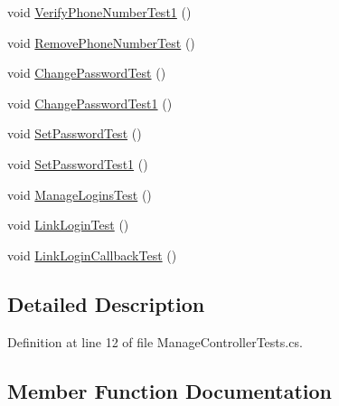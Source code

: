\begin{DoxyCompactItemize}
\item 
void \mbox{\hyperlink{class_brew_day2_1_1_controllers_1_1_tests_1_1_manage_controller_tests_a5c75a704b464473413d777a604c4e5f2}{Verify\+Phone\+Number\+Test1}} ()
\item 
void \mbox{\hyperlink{class_brew_day2_1_1_controllers_1_1_tests_1_1_manage_controller_tests_a871e48711dda070e563e559cc0261067}{Remove\+Phone\+Number\+Test}} ()
\item 
void \mbox{\hyperlink{class_brew_day2_1_1_controllers_1_1_tests_1_1_manage_controller_tests_af4ebad6cd88004066712e10698e682c3}{Change\+Password\+Test}} ()
\item 
void \mbox{\hyperlink{class_brew_day2_1_1_controllers_1_1_tests_1_1_manage_controller_tests_aa821b08002a649acce8a3915ff213450}{Change\+Password\+Test1}} ()
\item 
void \mbox{\hyperlink{class_brew_day2_1_1_controllers_1_1_tests_1_1_manage_controller_tests_a53cb70b1db0228d8ee4d9b4cd9ac5545}{Set\+Password\+Test}} ()
\item 
void \mbox{\hyperlink{class_brew_day2_1_1_controllers_1_1_tests_1_1_manage_controller_tests_ab0f016118fcf2b2baefac3bf615c0784}{Set\+Password\+Test1}} ()
\item 
void \mbox{\hyperlink{class_brew_day2_1_1_controllers_1_1_tests_1_1_manage_controller_tests_a0bc1e277fe59a196813658d93b06cde0}{Manage\+Logins\+Test}} ()
\item 
void \mbox{\hyperlink{class_brew_day2_1_1_controllers_1_1_tests_1_1_manage_controller_tests_ae88c5c07bcd5065bae4ed2dcb23e9651}{Link\+Login\+Test}} ()
\item 
void \mbox{\hyperlink{class_brew_day2_1_1_controllers_1_1_tests_1_1_manage_controller_tests_a3dca33d36df5299b2e82cb07729825ab}{Link\+Login\+Callback\+Test}} ()
\end{DoxyCompactItemize}


\subsection{Detailed Description}


Definition at line 12 of file Manage\+Controller\+Tests.\+cs.



\subsection{Member Function Documentation}
\mbox{\label{class_brew_day2_1_1_controllers_1_1_tests_1_1_manage_controller_tests_a23dcf53861be7ab6fc7bba3e8f299862}} 
